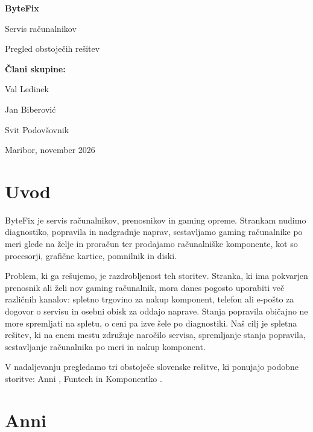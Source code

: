 \documentclass[11pt,a4paper]{article}
\begin{document}
\begin{titlepage}
  \centering
  \vspace*{3cm}
  {\Huge\bfseries ByteFix\par}
  \vspace{0.5cm}
  {\Large Servis računalnikov\par}
  \vspace{2cm}
  {\LARGE Pregled obstoječih rešitev\par}
  \vspace{3cm}
  {\large\bfseries Člani skupine:\par}
  \vspace{0.4cm}
  {\large
  Val Ledinek\par
  Jan Biberović\par
  Svit Podovšovnik\par 
  }
  \vfill
  {\large Maribor, november 2026\par}
\end{titlepage}

\tableofcontents
\newpage

\section{Uvod}

ByteFix je servis računalnikov, prenosnikov in gaming opreme. Strankam nudimo
diagnostiko, popravila in nadgradnje naprav, sestavljamo gaming računalnike po
meri glede na želje in proračun ter prodajamo računalniške komponente, kot so
procesorji, grafične kartice, pomnilnik in diski.

Problem, ki ga rešujemo, je razdrobljenost teh storitev. Stranka, ki ima pokvarjen prenosnik ali želi nov gaming računalnik, mora danes pogosto uporabiti več različnih kanalov: spletno trgovino za nakup komponent, telefon
ali e-pošto za dogovor o servisu in osebni obisk za oddajo naprave. Stanja popravila običajno ne more spremljati na spletu, o ceni pa izve šele po diagnostiki. Naš cilj je spletna rešitev, ki na enem mestu združuje naročilo servisa, spremljanje stanja popravila, sestavljanje računalnika po meri in nakup komponent.

V nadaljevanju pregledamo tri obstoječe slovenske rešitve, ki ponujajo
podobne storitve: Anni \cite{anni}, Funtech \cite{funtech} in Komponentko
\cite{komponentko}.

\section{Anni}
\end{document}
